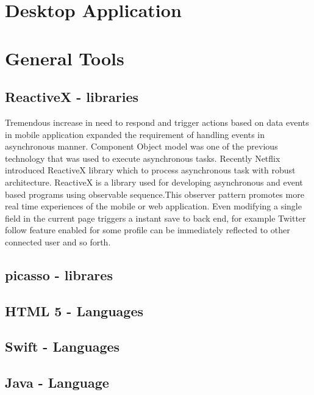 \section{Desktop Application}


\section{General Tools}

\subsection{ReactiveX - libraries}

			Tremendous increase in need to respond and trigger actions based on data events in mobile application expanded the requirement of handling events in asynchronous manner. Component Object model was one of the previous technology that was used to execute asynchronous tasks. Recently Netflix introduced ReactiveX library which to process asynchronous task with robust architecture. ReactiveX is a library used for developing asynchronous  and event based programs using observable sequence.This observer pattern promotes more real time experiences of the mobile or web application. Even modifying a single field in the current page triggers a instant save to back end, for example Twitter follow feature enabled for some profile can be immediately reflected to other connected user and so forth.
			
\subsection{picasso - librares}

\subsection{HTML 5 - Languages}
\subsection{Swift - Languages}
\subsection{Java - Language} 